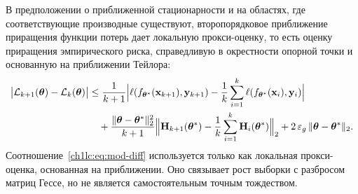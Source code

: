 \documentclass{dissert}
\begin{document}
В предположении о приближенной стационарности и на областях, где соответствующие производные существуют, второпорядковое приближение приращения функции потерь дает локальную прокси-оценку, то есть оценку приращения эмпирического риска, справедливую в окрестности опорной точки и основанную на приближении Тейлора:
\begin{equation}\label{ch1lc:eq:mod-diff}
\begin{split}
  \bigl|\mathcal{L}_{k+1}(\boldsymbol{\theta}) - \mathcal{L}_k(\boldsymbol{\theta})\bigr|
  &\le \frac{1}{k+1}\Bigl|\ell(f_{\boldsymbol{\theta}^*}(\mathbf{x}_{k+1}),\mathbf{y}_{k+1})
  - \frac{1}{k}\sum_{i=1}^{k}\ell(f_{\boldsymbol{\theta}^*}(\mathbf{x}_i),\mathbf{y}_i)\Bigr| \\
  &\quad+ \frac{\|\boldsymbol{\theta}-\boldsymbol{\theta}^*\|_2^2}{k+1}
  \Bigl\|\mathbf{H}_{k+1}(\boldsymbol{\theta}^*) - \frac{1}{k}\sum_{i=1}^{k}\mathbf{H}_{i}(\boldsymbol{\theta}^*)\Bigr\|_2
  + 2\,\varepsilon_g\,\|\boldsymbol{\theta}-\boldsymbol{\theta}^*\|_2 .
\end{split}
\end{equation}
Соотношение~\eqref{ch1lc:eq:mod-diff} используется только как локальная прокси-оценка, основанная на приближении. Оно связывает рост выборки с разбросом матриц Гессе, но не является самостоятельным точным тождеством.
\end{document}
